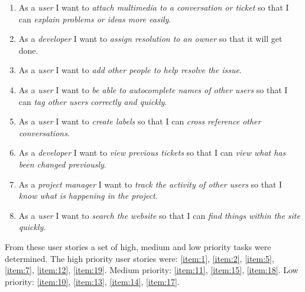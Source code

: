 \documentclass[a4paper]{l3proj}
\begin{document}
\begin{enumerate}[ref=\arabic*]
\item As a \textit{user} I want to \textit{attach multimedia to a conversation or ticket} so that I can \textit{explain problems or ideas more easily}.\label{item:14}
\item As a \textit{developer} I want to \textit{assign resolution to an owner} so that it will get done.\label{item:15}
\item As a \textit{user} I want to \textit{add other people to help resolve the issue}.\label{item:16}
\item As a \textit{user} I want to \textit{be able to autocomplete names of other users} so that I can \textit{tag other users correctly and quickly}.\label{item:17}
\item As a \textit{user} I want to \textit{create labels} so that I can \textit{cross reference other conversations}.\label{item:18}
\item As a \textit{developer} I want to \textit{view previous tickets} so that I can \textit{view what has been changed previously}.\label{item:19}
\item As a \textit{project manager} I want to \textit{track the activity of other users} so that I \textit{know what is happening in the project}.\label{item:20}
\item As a \textit{user} I want to \textit{search the website} so that I can \textit{find things within the site quickly}.\label{item:21}
\end{enumerate}

From these user stories a set of high, medium and low priority tasks were determined. The high priority user stories were: \ref{item:1}, \ref{item:2}, \ref{item:5}, \ref{item:7}, \ref{item:12}, \ref{item:19}. Medium priority: \ref{item:11}, \ref{item:15}, \ref{item:18}. Low priority: \ref{item:10}, \ref{item:13}, \ref{item:14}, \ref{item:17}.

\iffalse
\end{document}
